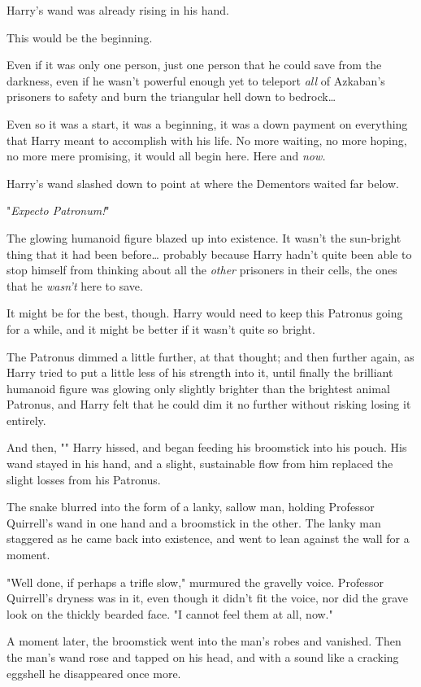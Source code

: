 Harry's wand was already rising in his hand.

This would be the beginning.

Even if it was only one person, just one person that he could save from the
darkness, even if he wasn't powerful enough yet to teleport \emph{all} of
Azkaban's prisoners to safety and burn the triangular hell down to
bedrock{\ldots}

Even so it was a start, it was a beginning, it was a down payment on everything
that Harry meant to accomplish with his life. No more waiting, no more hoping,
no more mere promising, it would all begin here. Here and \emph{now.}

Harry's wand slashed down to point at where the Dementors waited far below.

"\emph{Expecto Patronum!}"

The glowing humanoid figure blazed up into existence. It wasn't the sun-bright
thing that it had been before{\ldots} probably because Harry hadn't quite been
able to stop himself from thinking about all the \emph{other} prisoners in
their cells, the ones that he \emph{wasn't} here to save.

It might be for the best, though. Harry would need to keep this Patronus going
for a while, and it might be better if it wasn't quite so bright.

The Patronus dimmed a little further, at that thought; and then further again,
as Harry tried to put a little less of his strength into it, until finally the
brilliant humanoid figure was glowing only slightly brighter than the brightest
animal Patronus, and Harry felt that he could dim it no further without risking
losing it entirely.

And then, "" Harry hissed, and began feeding his
broomstick into his pouch. His wand stayed in his hand, and a slight,
sustainable flow from him replaced the slight losses from his Patronus.

The snake blurred into the form of a lanky, sallow man, holding Professor
Quirrell's wand in one hand and a broomstick in the other. The lanky man
staggered as he came back into existence, and went to lean against the wall for
a moment.

"Well done, if perhaps a trifle slow," murmured the gravelly voice. Professor
Quirrell's dryness was in it, even though it didn't fit the voice, nor did the
grave look on the thickly bearded face. "I cannot feel them at all, now."

A moment later, the broomstick went into the man's robes and vanished. Then the
man's wand rose and tapped on his head, and with a sound like a cracking
eggshell he disappeared once more.

